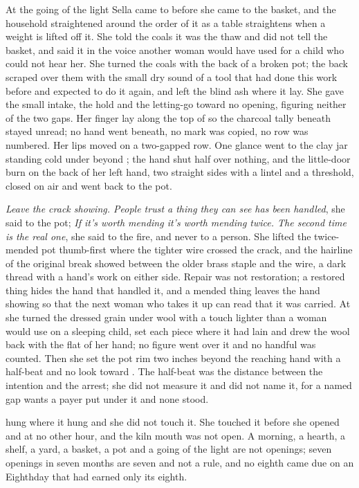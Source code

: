 \scenebreak

At the going of the light Sella came to  before she came to the basket, and the household straightened around the order of it as a table straightens when a weight is lifted off it. She told the coals it was the thaw and did not tell the basket, and said it in the voice another woman would have used for a child who could not hear her. She turned the coals with the back of a broken pot; the back scraped over them with the small dry sound of a tool that had done this work before and expected to do it again, and left the blind ash where it lay. She gave the small intake, the hold and the letting-go toward no opening, figuring neither of the two gaps. Her finger lay along the top of  so the charcoal tally beneath stayed unread; no hand went beneath, no mark was copied, no row was numbered. Her lips moved on a two-gapped row. One glance went to the clay jar standing cold under  beyond ; the hand shut half over nothing, and the little-door burn on the back of her left hand, two straight sides with a lintel and a threshold, closed on air and went back to the pot.

\emph{Leave the crack showing. People trust a thing they can see has been handled}, she said to the pot; \emph{If it's worth mending it's worth mending twice. The second time is the real one}, she said to the fire, and never to a person. She lifted the twice-mended pot thumb-first where the tighter wire crossed the crack, and the hairline of the original break showed between the older brass staple and the wire, a dark thread with a hand's work on either side. Repair was not restoration; a restored thing hides the hand that handled it, and a mended thing leaves the hand showing so that the next woman who takes it up can read that it was carried. At  she turned the dressed grain under wool with a touch lighter than a woman would use on a sleeping child, set each piece where it had lain and drew the wool back with the flat of her hand; no figure went over it and no handful was counted. Then she set the pot rim two inches beyond the reaching hand with a half-beat and no look toward . The half-beat was the distance between the intention and the arrest; she did not measure it and did not name it, for a named gap wants a payer put under it and none stood.

 hung where it hung and she did not touch it. She touched it before she opened  and at no other hour, and the kiln mouth was not open. A morning, a hearth, a shelf, a yard, a basket, a pot and a going of the light are not openings; seven openings in seven months are seven and not a rule, and no eighth came due on an Eighthday that had earned only its eighth.

